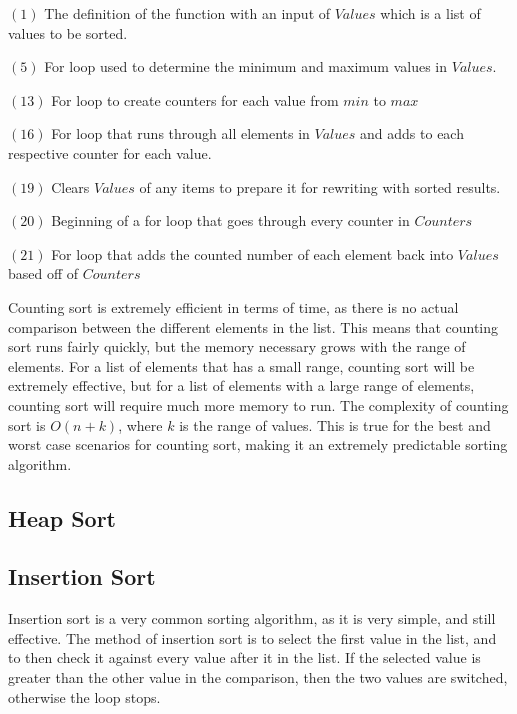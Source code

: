 \documentclass{article}
\begin{document}
\begin{multicols}{2}
$(1)$ The definition of the function with an input of $Values$ which is a list of values to be sorted.

$(5)$ For loop used to determine the minimum and maximum values in $Values$.

$(13)$ For loop to create counters for each value from $min$ to $max$

$(16)$ For loop that runs through all elements in $Values$ and adds to each respective counter for each value.

$(19)$ Clears $Values$ of any items to prepare it for rewriting with sorted results.

$(20)$ Beginning of a for loop that goes through every counter in $Counters$

$(21)$ For loop that adds the counted number of each element back into $Values$ based off of $Counters$
\end{multicols}
\begin{multicols}{2}
Counting sort is extremely efficient in terms of time, as there is no actual comparison between the different elements in the list. This means that counting sort runs fairly quickly, but the memory necessary grows with the range of elements. For a list of elements that has a small range, counting sort will be extremely effective, but for a list of elements with a large range of elements, counting sort will require much more memory to run. The complexity of counting sort is $O(n+k)$, where $k$ is the range of values. This is true for the best and worst case scenarios for counting sort, making it an extremely predictable sorting algorithm.
\end{multicols}
\subsection{Heap Sort}
\subsection{Insertion Sort}
\begin{multicols}{2}
Insertion sort is a very common sorting algorithm, as it is very simple, and still effective. The method of insertion sort is to select the first value in the list, and to then check it against every value after it in the list. If the selected value is greater than the other value in the comparison, then the two values are switched, otherwise the loop stops.
\end{multicols}
\end{document}
